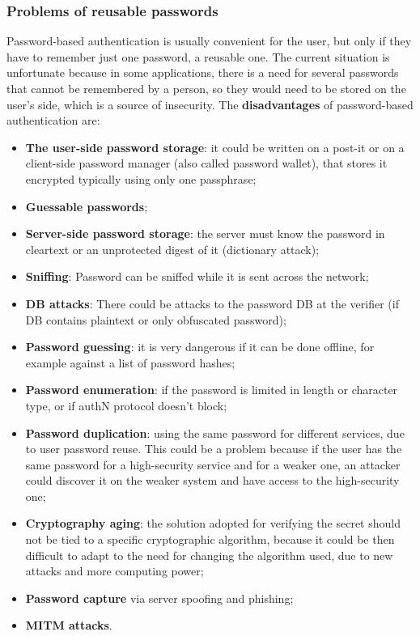 \subsubsection{Problems of reusable passwords}
Password-based authentication is usually convenient for the user, but only if they have to remember just one password, a reusable one. The current situation is unfortunate because in some applications, there is a need for several passwords that cannot be remembered by a person, so they would need to be stored on the user's side, which is a source of insecurity. The \textbf{disadvantages} of password-based authentication are:
\begin{itemize}
  \item \textbf{The user-side password storage}: it could be written on a post-it or on a client-side password manager (also called password wallet), that stores it encrypted typically using only one passphrase;
  \item \textbf{Guessable passwords};
  \item \textbf{Server-side password storage}: the server must know the password in cleartext or an unprotected digest of it (dictionary attack);
  \item \textbf{Sniffing}: Password can be sniffed while it is sent across the network;
  \item \textbf{DB attacks}: There could be attacks to the password DB at the verifier (if DB contains plaintext or only obfuscated password);
  \item \textbf{Password guessing}: it is very dangerous if it can be done offline, for example against a list of password hashes;
  \item \textbf{Password enumeration}: if the password is limited in length or character type, or if authN protocol doesn't block;
  \item \textbf{Password duplication}: using the same password for different services, due to user password reuse. This could be a problem because if the user has the same password for a high-security service and for a weaker one, an attacker could discover it on the weaker system and have access to the high-security one;
  \item \textbf{Cryptography aging}: the solution adopted for verifying the secret should not be tied to a specific cryptographic algorithm, because it could be then difficult to adapt to the need for changing the algorithm used, due to new attacks and more computing power;
  \item \textbf{Password capture} via server spoofing and phishing;
  \item \textbf{MITM attacks}.
\end{itemize}



